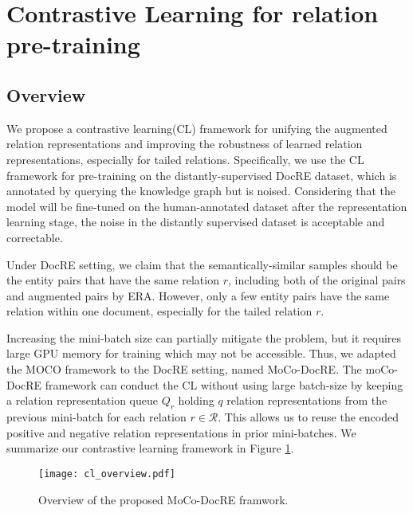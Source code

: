 \documentclass[11pt]{article}
\begin{document}
\section{Contrastive Learning for relation pre-training}
\subsection{Overview}
   We propose a contrastive learning(CL) framework for unifying the augmented relation representations and improving the robustness of learned relation representations, especially for tailed relations. Specifically, we use the CL framework for pre-training on the distantly-supervised DocRE dataset\citep{yao-etal-2019-docred}, which is annotated by querying the knowledge graph but is noised. Considering that the model will be fine-tuned on the human-annotated dataset after the representation learning stage, the noise in the distantly supervised dataset is acceptable and correctable.
    
    Under DocRE setting, we claim that the semantically-similar samples should be the entity pairs that have the same relation $r$, including both of the original pairs and augmented pairs by ERA. However, only a few entity pairs have the same relation within one document, especially for the tailed relation $r$. 
    
    Increasing the mini-batch size can partially mitigate the problem, but it requires large GPU memory for training which may not be accessible. Thus, we adapted the MOCO framework \citep{he_momentum_2020} to the DocRE setting, named MoCo-DocRE. The moCo-DocRE framework can conduct the CL without using large batch-size by keeping a relation representation queue $Q_r$ holding $q$ relation representations from the previous mini-batch for each relation $r \in \mathcal{R}$. This allows us to reuse the encoded positive and negative relation representations in prior mini-batches. We summarize our contrastive learning framework in Figure \ref{fig:cl_overview}.
    \begin{figure}[t]
        \centering
        \texttt{[image: cl\_overview.pdf]}
        \caption{Overview of the proposed MoCo-DocRE framwork.}
        \label{fig:cl_overview}
    \end{figure}
\end{document}
